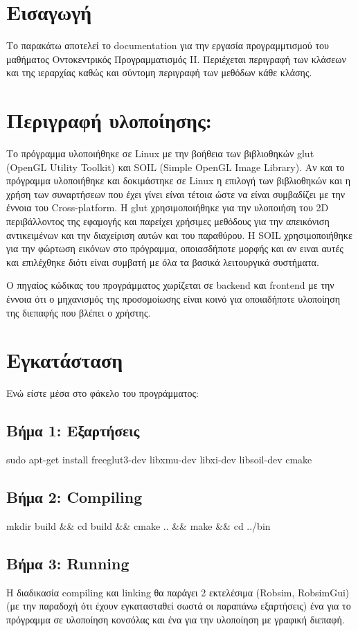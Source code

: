 \hypertarget{index_intro_sec}{}\section{Εισαγωγή}\label{index_intro_sec}
Το παρακάτω αποτελεί το documentation για την εργασία προγραμμτισμού του μαθήματος Οντοκεντρικός Προγραμματισμός I\-I. Περιέχεται περιγραφή των κλάσεων και της ιεραρχίας καθώς και σύντομη περιγραφή των μεθόδων κάθε κλάσης.\hypertarget{index_decription_sec}{}\section{Περιγραφή υλοποίησης\-:}\label{index_decription_sec}
Το πρόγραμμα υλοποιήθηκε σε Linux με την βοήθεια των βιβλιοθηκών glut (Open\-G\-L Utility Toolkit) και S\-O\-I\-L (Simple Open\-G\-L Image Library). Αν και το πρόγραμμα υλοποιήθηκε και δοκιμάστηκε σε Linux η επιλογή των βιβλιοθηκών και η χρήση των συναρτήσεων που έχει γίνει είναι τέτοια ώστε να είναι συμβαδίζει με την έννοια του Cross-\/platform. Η glut χρησιμοποιήθηκε για την υλοποιήση του 2\-D περιβάλλοντος της εφαμογής και παρείχει χρήσιμες μεθόδους για την απεικόνιση αντικειμένων και την διαχείριση αυτών και του παραθύρου. Η S\-O\-I\-L χρησιμοποιήθηκε για την φώρτωση εικόνων στο πρόγραμμα, οποιασδήποτε μορφής και αν ειναι αυτές και επιλέχθηκε διότι είναι συμβατή με όλα τα βασικά λειτουργικά συστήματα.

Ο πηγαίος κώδικας του προγράμματος χωρίζεται σε backend και frontend με την έννοια ότι ο μηχανισμός της προσομοίωσης είναι κοινό για οποιαδήποτε υλοποίηση της διεπαφής που βλέπει ο χρήστης.\hypertarget{index_install_sec}{}\section{Εγκατάσταση}\label{index_install_sec}
Ενώ είστε μέσα στο φάκελο του προγράμματος\-:\hypertarget{index_step1}{}\subsection{Βήμα 1\-: Εξαρτήσεις}\label{index_step1}
\begin{center} sudo apt-\/get install freeglut3-\/dev libxmu-\/dev libxi-\/dev libsoil-\/dev cmake \end{center} \hypertarget{index_step2}{}\subsection{Βήμα 2\-: Compiling}\label{index_step2}
\begin{center} mkdir build \&\& cd build \&\& cmake .. \&\& make \&\& cd ../bin \end{center} \hypertarget{index_step3}{}\subsection{Βήμα 3\-: Running}\label{index_step3}
Η διαδικασία compiling και linking θα παράγει 2 εκτελέσιμα (Robsim, Robsim\-Gui) (με την παραδοχή ότι έχουν εγκατασταθεί σωστά οι παραπάνω εξαρτήσεις) ένα για το πρόγραμμα σε υλοποίηση κονσόλας και ένα για την υλοποίηση με γραφική διεπαφή.

